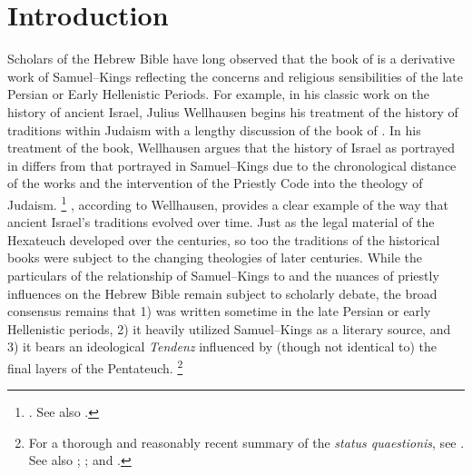\section{Introduction}

Scholars of the Hebrew Bible have long observed that the book of \chronicles is a derivative work of Samuel--Kings reflecting the concerns and religious sensibilities of the late Persian or Early Hellenistic Periods. For example, in his classic work on the history of ancient Israel, Julius Wellhausen begins his treatment of the history of traditions within Judaism with a lengthy discussion of the book of \chronicles. In his treatment of the book, Wellhausen argues that the history of Israel as portrayed in \chronicles differs from that portrayed in Samuel--Kings due to the chronological distance of the works and the intervention of the Priestly Code into the theology of \secondtemple Judaism.%
    \footnote{%
        \cite[171--172]{wellhausen1957}. See also
        \cite{wright_ulrich-wright1992}.}
\chronicles, according to Wellhausen, provides a clear example of the way that ancient Israel's traditions evolved over time. Just as the legal material of the Hexateuch developed over the centuries, so too the traditions of the historical books were subject to the changing theologies of later centuries. While the particulars of the relationship of Samuel--Kings to \chronicles and the nuances of priestly influences on the Hebrew Bible remain subject to scholarly debate, the broad consensus remains that 1) \chronicles was written sometime in the late Persian or early Hellenistic periods, 2) it heavily utilized Samuel--Kings as a literary source, and 3) it bears an ideological \emph{Tendenz} influenced by (though not identical to) the final layers of the Pentateuch.%
    \footnote{For a thorough and reasonably recent summary of the \emph{status quaestionis}, see 
        \cite[72--89]{knoppers2003}. See also
        \cite{japhet1993};
        \cite{japhet2009};
        \cite{braun1986} and
        \cite{coggins1976}.}

